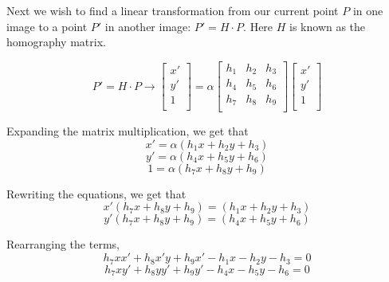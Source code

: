 \documentclass[12pt]{article}
\begin{document}
Next we wish to find a linear transformation from our current point $P$ in one image to a point $P'$ in another image: $P' = H \cdot P $. Here $H$ is known as the homography matrix.\\


\begin{equation*}
P' = H \cdot P \rightarrow 
\begin{bmatrix}
x'\\
y'\\
1\\
\end{bmatrix} =  \alpha
\begin{bmatrix}
h_1 & h_2 & h_3\\
h_4 & h_5 & h_6\\
h_7 & h_8 & h_9\\
\end{bmatrix}
\begin{bmatrix}
x'\\
y'\\
1\\
\end{bmatrix}
\end{equation*}

Expanding the matrix multiplication, we get that 
\begin{equation*}
x' =\alpha( h_1x + h_2y + h_3 )
\end{equation*}
\begin{equation*}
y' = \alpha(h_4x + h_5y + h_6 )
\end{equation*}
\begin{equation*}
1 = \alpha(h_7x + h_8y + h_9 )
\end{equation*}

Rewriting the equations, we get that 
\begin{equation*}
x'(h_7x + h_8y + h_9 ) = ( h_1x + h_2y + h_3 )
\end{equation*}
\begin{equation*}
y'(h_7x + h_8y + h_9 ) =(h_4x + h_5y + h_6 )
\end{equation*}

Rearranging the terms,
\begin{equation*}
h_7xx' + h_8x'y + h_9x' - h_1x - h_2y - h_3 = 0
\end{equation*}
\begin{equation*}
h_7xy' + h_8yy' + h_9y' - h_4x - h_5y - h_6 = 0
\end{equation*}
\end{document}
